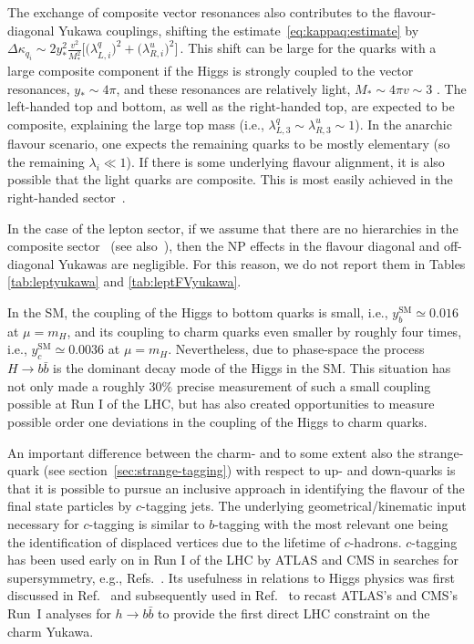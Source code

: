 \documentclass[../report.tex]{subfiles}
\begin{document}
The exchange of composite vector resonances also contributes to the
flavour-diagonal Yukawa couplings, shifting the
estimate~\eqref{eq:kappaq:estimate} by 
$\Delta \kappa_{q_i}\sim 2 y_*^2 \frac{v^2}{M_*^2}
\Big[\big(\lambda_{L,i}^q\big)^2+ \big(\lambda_{R,i}^u\big)^2\Big] \,$.
This shift can be large for the quarks with a large composite
component if the Higgs is strongly coupled to the vector resonances,
$y_*\sim 4\pi$, and these resonances are relatively light, $M_*\sim
4\pi v\sim 3$ \UTeV. The left-handed top and bottom, as well as the
right-handed top, are expected to be composite, explaining the large
top mass (i.e., $\lambda_{L,3}^q\sim \lambda_{R,3}^u\sim 1$). In the
anarchic flavour scenario, one expects the remaining quarks to be
mostly elementary (so the remaining $\lambda_i\ll 1$).  
If there is some underlying flavour alignment, it is also possible that
the light quarks are composite. This is most easily achieved in the
right-handed sector~\cite{Redi:2011zi, Redi:2012uj,
  Delaunay:2013iia}.

In the case of the lepton sector, if we assume that there are no
hierarchies in the composite sector~\cite{Redi:2013pga} (see also~\cite{Csaki:2008qq,delAguila:2010vg,Hagedorn:2011un,Hagedorn:2011pw}), then the NP
effects in the flavour diagonal and off-diagonal Yukawas are
negligible. For this reason, we do not report them in Tables \ref{tab:leptyukawa} and \ref{tab:leptFVyukawa}.






In the SM, the coupling of the Higgs to bottom quarks is small, i.e.,
$y_b^{\text{SM}}\simeq 0.016$ at $\mu=m_H$, and 
its coupling to charm quarks even smaller by roughly four times,
i.e., $y_c^{\text{SM}}\simeq 0.0036$ at $\mu=m_H$.
Nevertheless, due to phase-space the process $H\to b\bar b$ is the dominant 
decay mode of the Higgs in the SM.
This situation has not only made a roughly $30\%$ precise measurement of such 
a small coupling possible at Run I of the LHC, but has also created 
opportunities to measure possible order one deviations in the 
coupling of the Higgs to charm quarks.

An important difference between the charm- and to some extent also the strange-quark (see section~\ref{sec:strange-tagging}) with respect to up- and 
down-quarks is that it is possible to pursue an inclusive approach in
identifying the flavour of the final state particles by $c$-tagging jets.
The underlying geometrical/kinematic input necessary for $c$-tagging
is similar to $b$-tagging with the most relevant one being the identification
of displaced vertices due to the lifetime of $c$-hadrons.
$c$-tagging has been used early on in Run I of the LHC by ATLAS and CMS in searches for supersymmetry, e.g., Refs.~\cite{Aad:2014nra,Aad:2015gna}.
Its usefulness in relations to Higgs physics was first discussed in Ref.~\cite{Delaunay:2013pja} and subsequently
used in Ref.~\cite{Perez:2015aoa} to recast ATLAS's and CMS's Run~I analyses for $h\to b\bar b$ to provide the first direct LHC 
constraint on the charm Yukawa. 
\end{document}
